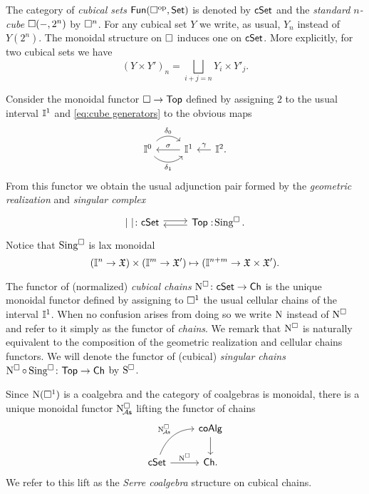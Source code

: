 The category of \textit{cubical sets} $\mathsf{Fun}(\square^{\mathrm{op}}, \mathsf{Set})$ is denoted by $\mathsf{cSet}$ and
the \textit{standard $n$-cube} $\square(-, 2^n)$ by $\square^n$.
For any cubical set $Y$ we write, as usual, $Y_n$ instead of $Y(2^n)$.
The monoidal structure on $\square$ induces one on $\mathsf{cSet}$.
More explicitly, for two cubical sets we have
\[
(Y \times Y')_n = \bigsqcup_{i+j=n} Y_i \times Y'_j.
\]

Consider the monoidal functor $\square \to \mathsf{Top}$ defined by assigning $2$ to the usual interval $\mathbb{I}^1$ and \eqref{eq:cube generators} to the obvious maps
\[
\begin{tikzcd}
	\gcube^0 \arrow[r, out=45, in=135, "\delta_0"] \arrow[r, out=-45, in=-135, "\delta_1"'] & \gcube^1 \arrow[l, "\sigma"'] &[-10pt] \arrow[l, "\gamma"'] \gcube^2.
\end{tikzcd}
\]
From this functor we obtain the usual adjunction pair formed by the \textit{geometric realization} and \textit{singular complex}
\[
\begin{tikzcd}
	\bars{\ } \colon \cSet \arrow[r, shift left=.5ex] &
	\Top :\! \cSing. \arrow[l, shift left=.5ex]
\end{tikzcd}
\]
Notice that $\operatorname{Sing^{\square}}$ is lax monoidal
\[
(\mathbb{I}^n \to \mathfrak{X}) \times (\mathbb{I}^m \to \mathfrak{X}') \mapsto (\mathbb{I}^{n+m} \to \mathfrak{X} \times \mathfrak{X}').
\]

The functor of (normalized) \textit{cubical chains} $\operatorname{N^{\square}} \colon \mathsf{cSet} \to \mathsf{Ch}$ is the unique monoidal functor defined by assigning to $\square^1$ the usual cellular chains of the interval $\mathbb{I}^1$.
When no confusion arises from doing so we write $\operatorname{N}$ instead of $\operatorname{N^{\square}}$ and refer to it simply as the functor of \textit{chains}.
We remark that $\operatorname{N^{\square}}$ is naturally equivalent to the composition of the geometric realization and cellular chains functors.
We will denote the functor of (cubical) \textit{singular chains} $\operatorname{N^{\square}} \circ \operatorname{Sing^{\square}} \colon \mathsf{Top} \to \mathsf{Ch}$ by $\operatorname{S^{\square}}$.

Since $\operatorname{N}(\square^1)$ is a coalgebra and the category of coalgebras is monoidal, there is a unique monoidal functor
$\operatorname{N^{\square}_{\!{\mathcal{A}\mathsf{s}}}}$ lifting the functor of chains
\[
\begin{tikzcd}
	& \coAlg \arrow[d] \\
	\cSet \arrow[r, "\cchains"] \arrow[ur, "\cchainsA", out=70, in=180] & \Ch.
\end{tikzcd}
\]
We refer to this lift as the \textit{Serre coalgebra} structure on cubical chains.